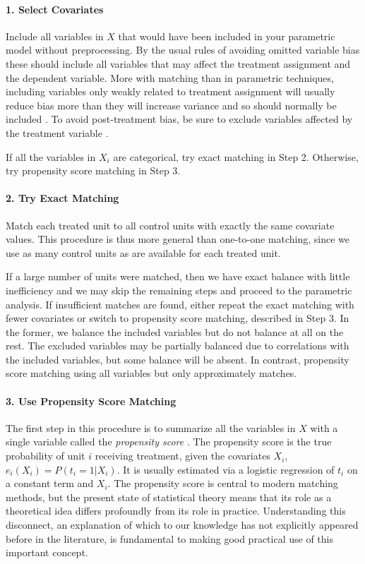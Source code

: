 \documentclass[11pt,titlepage]{article}
\begin{document}
\paragraph{1. Select Covariates}  
Include all variables in $X$ that would have been included in your
parametric model without preprocessing.  By the usual rules of
avoiding omitted variable bias these should include all variables that
may affect the treatment assignment and the dependent variable.  More
with matching than in parametric techniques, including variables only
weakly related to treatment assignment will usually reduce bias more
than they will increase variance and so should normally be included
\citep{RubTho96, HecIchSmi98}.  To avoid post-treatment bias, be sure
to exclude variables affected by the treatment variable
\citep{FraRub02,Greenland03,KinZen04}.

If all the variables in $X_i$ are categorical, try exact matching in
Step 2.  Otherwise, try propensity score matching in Step 3.
\paragraph{2. Try Exact Matching}  
Match each treated unit to all control units with exactly the same
covariate values.  This procedure is thus more general than one-to-one
matching, since we use as many control units as are available for each
treated unit.

If a large number of units were matched, then we have exact balance
with little inefficiency and we may skip the remaining steps and
proceed to the parametric analysis.  If insufficient matches are
found, either repeat the exact matching with fewer covariates or
switch to propensity score matching, described in Step 3.  In the
former, we balance the included variables but do not balance at all on
the rest.  The excluded variables may be partially balanced due to
correlations with the included variables, but some balance will be
absent.  In contrast, propensity score matching using all variables
but only approximately matches.

\paragraph{3. Use Propensity Score Matching}  
The first step in this procedure is to summarize all the variables in
$X$ with a single variable called the \emph{propensity score}
\citep{RosRub83}.  The propensity score is the true probability of
unit $i$ receiving treatment, given the covariates $X_i$, $e_i(X_i) =
P(t_i=1 | X_i)$.  It is usually estimated via a logistic regression of
$t_i$ on a constant term and $X_i$.  The propensity score is central
to modern matching methods, but the present state of statistical
theory means that its role as a theoretical idea differs profoundly
from its role in practice.  Understanding this disconnect, an
explanation of which to our knowledge has not explicitly appeared
before in the literature, is fundamental to making good practical use
of this important concept.
\end{document}

